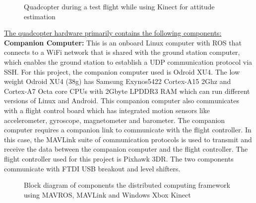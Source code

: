\documentclass[letterpaper%
, twoside%
, 12pt%
,memoire%
, english%
,creativecommons,hyperref%
]{thETS}
\theoremstyle{newThmStyle}
\begin{document}
\begin{figure}
	\centering
	\parbox{0.75\textwidth}{\caption{Quadcopter during a test flight while using Kinect for attitude estimation\label{Fig:quad_flying}}}
\end{figure}

\underline{The quadcopter hardware primarily contains the following components:}\\
\textbf{Companion Computer:} This is an onboard Linux computer with ROS that connects to a WiFi network that is shared with the ground station computer, which enables the ground station to establish a UDP communication protocol via SSH. For this project, the companion computer used is Odroid XU4. The low weight Odroid XU4 (38g) has Samsung Exynos5422 Cortex-A15 2Ghz and Cortex-A7 Octa core CPUs with 2Gbyte LPDDR3 RAM which can run different versions of Linux and Android. This companion computer also communicates with a flight control board which has integrated motion sensors like accelerometer, gyroscope, magnetometer and barometer. The companion computer requires a companion link to communicate with the flight controller. In this case, the MAVLink suite of communication protocols is used to transmit and receive the data between the companion computer and the flight controller. The flight controller used for this project is Pixhawk 3DR. The two components communicate with FTDI USB breakout and level shifters. 


\begin{figure}[H]
	\centering
	\resizebox{0.75\textwidth}{!}{\fbox{}}
	\parbox{0.75\textwidth}{\caption{Block diagram of components the distributed computing framework using MAVROS, MAVLink and Windows Xbox Kinect \label{Fig:distributed}}}
\end{figure}
\end{document}
